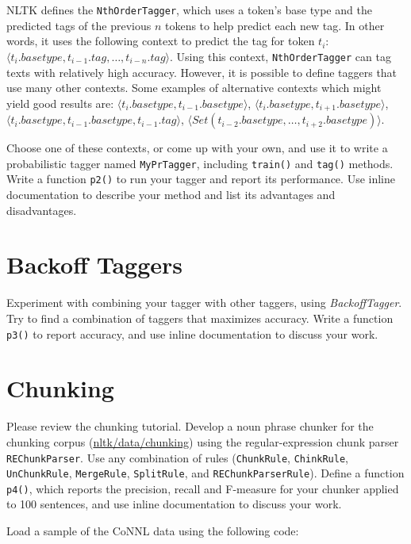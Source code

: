 \documentclass{460}
\begin{document}
NLTK defines the \texttt{NthOrderTagger}, which uses a token's base
type and the predicted tags of the previous $n$ tokens to help predict
each new tag.  In other words, it uses the following context to
predict the tag for token $t_i$:
$\langle t_i.basetype, t_{i-1}.tag, \ldots, t_{i-n}.tag\rangle$.
Using this context, \texttt{NthOrderTagger} can tag texts with
relatively high accuracy.  However, it is possible to define taggers
that use many other contexts.  Some examples of alternative contexts
which might yield good results are:
$\langle t_i.basetype, t_{i-1}.basetype\rangle$,
$\langle t_i.basetype, t_{i+1}.basetype\rangle$,
$\langle t_i.basetype, t_{i-1}.basetype, t_{i-1}.tag\rangle$,
$\langle Set(t_{i-2}.basetype, \ldots, t_{i+2}.basetype)\rangle$.

Choose one of these contexts, or come up with your own, and use it to
write a probabilistic tagger named \texttt{MyPrTagger}, including
\texttt{train()} and \texttt{tag()} methods.
Write a function \texttt{p2()} to run your tagger and
report its performance.  Use inline documentation to describe
your method and list its advantages and disadvantages.

\section{Backoff Taggers}

Experiment with combining your tagger with other taggers, using
\textit{BackoffTagger}.  Try to find a combination of taggers that
maximizes accuracy.  Write a function \texttt{p3()} to report
accuracy, and use inline documentation to discuss your work.

\section{Chunking}

Please review the chunking tutorial.
Develop a noun phrase chunker for the chunking corpus
(\url{nltk/data/chunking}) using the regular-expression
chunk parser \texttt{REChunkParser}.  Use any
combination of rules (\texttt{ChunkRule}, \texttt{ChinkRule},
\texttt{UnChunkRule}, \texttt{MergeRule}, \texttt{SplitRule}, and
\texttt{REChunkParserRule}).
Define a function \texttt{p4()}, which reports the precision,
recall and F-measure for your chunker applied to 100 sentences,
and use inline documentation to discuss your work.

Load a sample of the CoNNL data using the following code:
\end{document}
